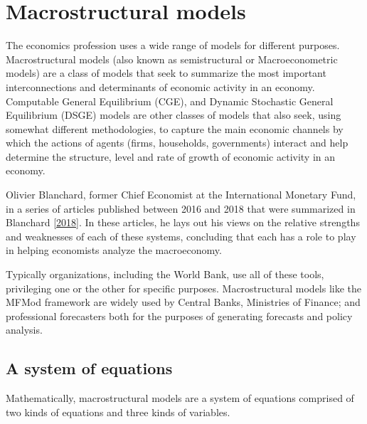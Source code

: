 \documentclass[letterpaper,10pt,english]{jupyterBook}
\begin{document}
\section{Macrostructural models}
\label{\detokenize{content/02_MacrostructuralModels/MacroStructuralModels:macrostructural-models}}\label{\detokenize{content/02_MacrostructuralModels/MacroStructuralModels::doc}}
\sphinxAtStartPar
The economics profession uses a wide range of models for different purposes.  Macro\sphinxhyphen{}structural models (also known as semi\sphinxhyphen{}structural or Macro\sphinxhyphen{}econometric models) are a class of models that seek to summarize the most important interconnections and determinants of economic activity in an economy. Computable General Equilibrium (CGE), and Dynamic Stochastic General Equilibrium (DSGE) models are other classes of models that also seek, using somewhat different methodologies, to capture the main economic channels by which the actions of agents (firms, households, governments) interact and help determine the structure, level and rate of growth of economic activity in an economy.

\sphinxAtStartPar
Olivier Blanchard, former Chief Economist at the International Monetary Fund, in a series of articles published between 2016 and 2018 that were summarized in Blanchard {[}\hyperlink{cite.content/99_BackMatter/References:id17}{2018}{]}. In these articles, he lays out his views on the relative strengths and weaknesses of each of these systems, concluding that each has a role to play in helping economists analyze the macro\sphinxhyphen{}economy.

\sphinxAtStartPar
Typically organizations, including the World Bank, use all of these tools, privileging one or the other for specific purposes. Macrostructural models like the MFMod framework are widely used by Central Banks, Ministries of Finance; and professional forecasters both for the purposes of generating forecasts and policy analysis.


\subsection{A system of equations}
\label{\detokenize{content/02_MacrostructuralModels/MacroStructuralModels:a-system-of-equations}}
\sphinxAtStartPar
Mathematically, macro\sphinxhyphen{}structural models are a system of equations comprised of two kinds of equations and three kinds of variables.
\end{document}
